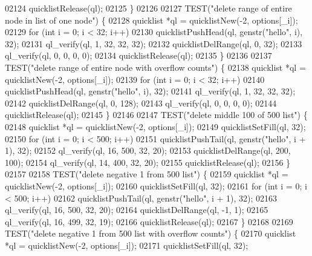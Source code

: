 \begin{DoxyCode}
{{{{{{{{{{{{{{{{{{{{{{{{{{{{{{{{{{{{{{{{{{{{{{{{{{{{{{{{{{{{{{{{{{{{{{02124             quicklistRelease(ql);
02125         \}
02126 
02127         TEST(\textcolor{stringliteral}{"delete range of entire node in list of one node"}) \{
02128             quicklist *ql = quicklistNew(-2, options[\_i]);
02129             \textcolor{keywordflow}{for} (\textcolor{keywordtype}{int} i = 0; i < 32; i++)
02130                 quicklistPushHead(ql, genstr(\textcolor{stringliteral}{"hello"}, i), 32);
02131             ql\_verify(ql, 1, 32, 32, 32);
02132             quicklistDelRange(ql, 0, 32);
02133             ql\_verify(ql, 0, 0, 0, 0);
02134             quicklistRelease(ql);
02135         \}
02136 
02137         TEST(\textcolor{stringliteral}{"delete range of entire node with overflow counts"}) \{
02138             quicklist *ql = quicklistNew(-2, options[\_i]);
02139             \textcolor{keywordflow}{for} (\textcolor{keywordtype}{int} i = 0; i < 32; i++)
02140                 quicklistPushHead(ql, genstr(\textcolor{stringliteral}{"hello"}, i), 32);
02141             ql\_verify(ql, 1, 32, 32, 32);
02142             quicklistDelRange(ql, 0, 128);
02143             ql\_verify(ql, 0, 0, 0, 0);
02144             quicklistRelease(ql);
02145         \}
02146 
02147         TEST(\textcolor{stringliteral}{"delete middle 100 of 500 list"}) \{
02148             quicklist *ql = quicklistNew(-2, options[\_i]);
02149             quicklistSetFill(ql, 32);
02150             \textcolor{keywordflow}{for} (\textcolor{keywordtype}{int} i = 0; i < 500; i++)
02151                 quicklistPushTail(ql, genstr(\textcolor{stringliteral}{"hello"}, i + 1), 32);
02152             ql\_verify(ql, 16, 500, 32, 20);
02153             quicklistDelRange(ql, 200, 100);
02154             ql\_verify(ql, 14, 400, 32, 20);
02155             quicklistRelease(ql);
02156         \}
02157 
02158         TEST(\textcolor{stringliteral}{"delete negative 1 from 500 list"}) \{
02159             quicklist *ql = quicklistNew(-2, options[\_i]);
02160             quicklistSetFill(ql, 32);
02161             \textcolor{keywordflow}{for} (\textcolor{keywordtype}{int} i = 0; i < 500; i++)
02162                 quicklistPushTail(ql, genstr(\textcolor{stringliteral}{"hello"}, i + 1), 32);
02163             ql\_verify(ql, 16, 500, 32, 20);
02164             quicklistDelRange(ql, -1, 1);
02165             ql\_verify(ql, 16, 499, 32, 19);
02166             quicklistRelease(ql);
02167         \}
02168 
02169         TEST(\textcolor{stringliteral}{"delete negative 1 from 500 list with overflow counts"}) \{
02170             quicklist *ql = quicklistNew(-2, options[\_i]);
02171             quicklistSetFill(ql, 32);
}}}}}}}}}}}}}}}}}}}}}}}}}}}}}}}}}}}}}}}}}}}}}}}}}}}}}}}}}}}}}}}}}}}}}}
\end{DoxyCode}
